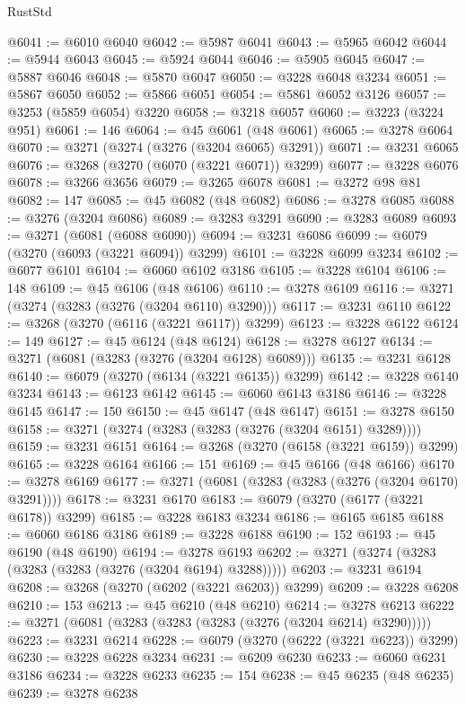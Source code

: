 \begin{lexlean}{RustStd}
\begin{coremodule}
{\begin{coremodule}
{{{{{{{{{{{{{{{{{{{{{{{{{{{{{{{{{{{{{@6041 := @6010 @6040
@6042 := @5987 @6041
@6043 := @5965 @6042
@6044 := @5944 @6043
@6045 := @5924 @6044
@6046 := @5905 @6045
@6047 := @5887 @6046
@6048 := @5870 @6047
@6050 := @3228 @6048 @3234
@6051 := @5867 @6050
@6052 := @5866 @6051
@6054 := @5861 @6052 @3126
@6057 := @3253 (@5859 @6054) @3220
@6058 := @3218 @6057
@6060 := @3223 (@3224 @951)
@6061 := 146
@6064 := @45 @6061 (@48 @6061)
@6065 := @3278 @6064
@6070 := @3271 (@3274 (@3276 (@3204 @6065) @3291))
@6071 := @3231 @6065
@6076 := @3268 (@3270 (@6070 (@3221 @6071)) @3299)
@6077 := @3228 @6076
@6078 := @3266 @3656
@6079 := @3265 @6078
@6081 := @3272 @98 @81
@6082 := 147
@6085 := @45 @6082 (@48 @6082)
@6086 := @3278 @6085
@6088 := @3276 (@3204 @6086)
@6089 := @3283 @3291
@6090 := @3283 @6089
@6093 := @3271 (@6081 (@6088 @6090))
@6094 := @3231 @6086
@6099 := @6079 (@3270 (@6093 (@3221 @6094)) @3299)
@6101 := @3228 @6099 @3234
@6102 := @6077 @6101
@6104 := @6060 @6102 @3186
@6105 := @3228 @6104
@6106 := 148
@6109 := @45 @6106 (@48 @6106)
@6110 := @3278 @6109
@6116 := @3271 (@3274 (@3283 (@3276 (@3204 @6110) @3290)))
@6117 := @3231 @6110
@6122 := @3268 (@3270 (@6116 (@3221 @6117)) @3299)
@6123 := @3228 @6122
@6124 := 149
@6127 := @45 @6124 (@48 @6124)
@6128 := @3278 @6127
@6134 := @3271 (@6081 (@3283 (@3276 (@3204 @6128) @6089)))
@6135 := @3231 @6128
@6140 := @6079 (@3270 (@6134 (@3221 @6135)) @3299)
@6142 := @3228 @6140 @3234
@6143 := @6123 @6142
@6145 := @6060 @6143 @3186
@6146 := @3228 @6145
@6147 := 150
@6150 := @45 @6147 (@48 @6147)
@6151 := @3278 @6150
@6158 := @3271 (@3274 (@3283 (@3283 (@3276 (@3204 @6151) @3289))))
@6159 := @3231 @6151
@6164 := @3268 (@3270 (@6158 (@3221 @6159)) @3299)
@6165 := @3228 @6164
@6166 := 151
@6169 := @45 @6166 (@48 @6166)
@6170 := @3278 @6169
@6177 := @3271 (@6081 (@3283 (@3283 (@3276 (@3204 @6170) @3291))))
@6178 := @3231 @6170
@6183 := @6079 (@3270 (@6177 (@3221 @6178)) @3299)
@6185 := @3228 @6183 @3234
@6186 := @6165 @6185
@6188 := @6060 @6186 @3186
@6189 := @3228 @6188
@6190 := 152
@6193 := @45 @6190 (@48 @6190)
@6194 := @3278 @6193
@6202 := @3271 (@3274 (@3283 (@3283 (@3283 (@3276 (@3204 @6194) @3288)))))
@6203 := @3231 @6194
@6208 := @3268 (@3270 (@6202 (@3221 @6203)) @3299)
@6209 := @3228 @6208
@6210 := 153
@6213 := @45 @6210 (@48 @6210)
@6214 := @3278 @6213
@6222 := @3271 (@6081 (@3283 (@3283 (@3283 (@3276 (@3204 @6214) @3290)))))
@6223 := @3231 @6214
@6228 := @6079 (@3270 (@6222 (@3221 @6223)) @3299)
@6230 := @3228 @6228 @3234
@6231 := @6209 @6230
@6233 := @6060 @6231 @3186
@6234 := @3228 @6233
@6235 := 154
@6238 := @45 @6235 (@48 @6235)
@6239 := @3278 @6238
}}}}}}}}}}}}}}}}}}}}}}}}}}}}}}}}}}}}}
\end{coremodule}}
\end{coremodule}
\end{lexlean}
